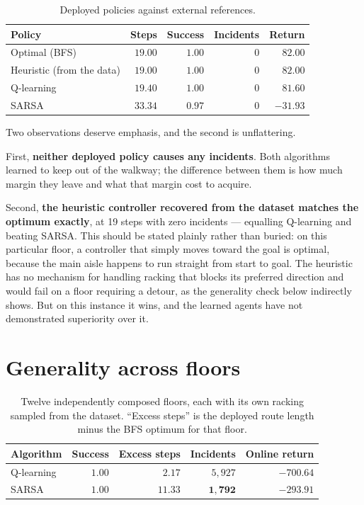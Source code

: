 \begin{table}[ht]
\centering
\caption[Baseline comparison]{Deployed policies against external references.}
\label{tab:baselines}
\begin{tabular}{lrrrr}
\toprule
\textbf{Policy} & \textbf{Steps} & \textbf{Success} & \textbf{Incidents} & \textbf{Return} \\
\midrule
Optimal (BFS)              & $19.00$ & $1.00$ & $0$ & $82.00$ \\
Heuristic (from the data)  & $19.00$ & $1.00$ & $0$ & $82.00$ \\
Q-learning                 & $19.40$ & $1.00$ & $0$ & $81.60$ \\
SARSA                      & $33.34$ & $0.97$ & $0$ & $-31.93$ \\
\bottomrule
\end{tabular}
\end{table}

Two observations deserve emphasis, and the second is unflattering.

First, \textbf{neither deployed policy causes any incidents}. Both algorithms learned to keep out
of the walkway; the difference between them is how much margin they leave and what that margin
cost to acquire.

Second, \textbf{the heuristic controller recovered from the dataset matches the optimum exactly},
at 19 steps with zero incidents --- equalling Q-learning and beating SARSA. This should be stated
plainly rather than buried: on this particular floor, a controller that simply moves toward the
goal is optimal, because the main aisle happens to run straight from start to goal. The heuristic
has no mechanism for handling racking that blocks its preferred direction and would fail on a floor
requiring a detour, as the generality check below indirectly shows. But on this instance it wins,
and the learned agents have not demonstrated superiority over it.

\section{Generality across floors}

\begin{table}[ht]
\centering
\caption[Generality check]{Twelve independently composed floors, each with its own racking sampled
from the dataset. ``Excess steps'' is the deployed route length minus the BFS optimum for that
floor.}
\label{tab:generality}
\begin{tabular}{lrrrr}
\toprule
\textbf{Algorithm} & \textbf{Success} & \textbf{Excess steps} & \textbf{Incidents} & \textbf{Online return} \\
\midrule
Q-learning & $1.00$ & $\mathbf{2.17}$ & $5{,}927$          & $-700.64$ \\
SARSA      & $1.00$ & $11.33$         & $\mathbf{1{,}792}$ & $\mathbf{-293.91}$ \\
\bottomrule
\end{tabular}
\end{table}

